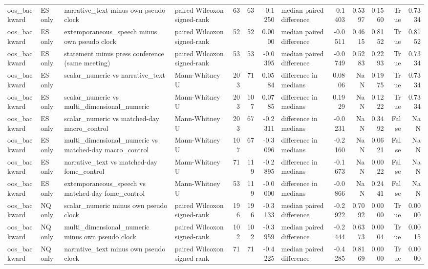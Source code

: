 \begin{tabular}{llllrrrlrrrrr}
oos_backward & ES only & narrative_text minus own pseudo clock & paired Wilcoxon signed-rank & 63 & 63 & -0.1250 & median paired difference & -0.1403 & 0.5397 & 0.1560 & True & 0.7334 \\
oos_backward & ES only & extemporaneous_speech minus own pseudo clock & paired Wilcoxon signed-rank & 52 & 52 & 0.0000 & median paired difference & -0.0511 & 0.4615 & 0.8152 & True & 0.8152 \\
oos_backward & ES only & statement minus press conference (same meeting) & paired Wilcoxon signed-rank & 53 & 53 & -0.0395 & median paired difference & -0.0749 & 0.5283 & 0.2293 & True & 0.7334 \\
oos_backward & ES only & scalar_numeric vs narrative_text & Mann-Whitney U & 203 & 71 & 0.0584 & difference in medians & 0.0806 & NaN & 0.1975 & True & 0.7334 \\
oos_backward & ES only & scalar_numeric vs multi_dimensional_numeric & Mann-Whitney U & 203 & 107 & 0.0785 & difference in medians & 0.1929 & NaN & 0.1222 & True & 0.7334 \\
oos_backward & ES only & scalar_numeric vs matched-day macro_control & Mann-Whitney U & 203 & 67 & -0.2311 & difference in medians & -0.0231 & NaN & 0.3492 & False & NaN \\
oos_backward & ES only & multi_dimensional_numeric vs matched-day macro_control & Mann-Whitney U & 107 & 67 & -0.3096 & difference in medians & -0.2160 & NaN & 0.0621 & False & NaN \\
oos_backward & ES only & narrative_text vs matched-day fomc_control & Mann-Whitney U & 71 & 119 & -0.2895 & difference in medians & -0.1673 & NaN & 0.0022 & False & NaN \\
oos_backward & ES only & extemporaneous_speech vs matched-day fomc_control & Mann-Whitney U & 53 & 119 & -0.0000 & difference in medians & -0.0866 & NaN & 0.2441 & False & NaN \\
oos_backward & NQ only & scalar_numeric minus own pseudo clock & paired Wilcoxon signed-rank & 196 & 196 & -0.3133 & median paired difference & -0.2922 & 0.7092 & 0.0000 & True & 0.0000 \\
oos_backward & NQ only & multi_dimensional_numeric minus own pseudo clock & paired Wilcoxon signed-rank & 102 & 102 & -0.3959 & median paired difference & -0.2444 & 0.6373 & 0.0004 & True & 0.0015 \\
oos_backward & NQ only & narrative_text minus own pseudo clock & paired Wilcoxon signed-rank & 71 & 71 & -0.4225 & median paired difference & -0.4285 & 0.8169 & 0.0000 & True & 0.0000 \\

\end{tabular}

